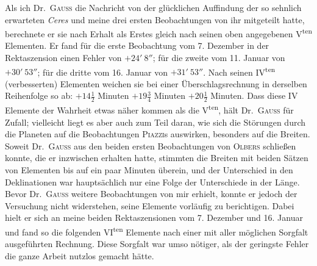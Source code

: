 Als ich Dr.\ \textsc{Gauss} die Nachricht von der glücklichen Auffindung der so sehnlich erwarteten \textit{Ceres} und meine drei ersten Beobachtungen von ihr mitgeteilt hatte, berechnete er sie nach Erhalt als Erstes gleich nach seinen oben angegebenen V\textsuperscript{ten} Elementen. Er fand für die erste Beobachtung vom 7. Dezember in der Rektaszension einen Fehler von $+24'\ 8''$; für die zweite vom 11. Januar von $+30'\ 53''$; für die dritte vom 16. Januar von $+31'\ 53''$. Nach seinen IV\textsuperscript{ten} (verbesserten) Elementen weichen sie bei einer Überschlagsrechnung in derselben Reihenfolge so ab: $+14\frac12$ Minuten $+19\frac34$ Minuten $+20\frac12$ Minuten. Dass diese IV Elemente der Wahrheit etwas näher kommen als die V\textsuperscript{ten}, hält Dr.\ \textsc{Gauss} für Zufall; vielleicht liegt es aber auch zum Teil daran, wie sich die Störungen durch die Planeten auf die Beobachtungen \textsc{Piazzi}s auswirken, besonders auf die Breiten. Soweit Dr.\ \textsc{Gauss} aus den beiden ersten Beobachtungen von \textsc{Olbers} schließen konnte, die er inzwischen erhalten hatte, stimmten die Breiten mit beiden Sätzen von Elementen bis auf ein paar Minuten überein, und der Unterschied in den Deklinationen war hauptsächlich nur eine Folge der Unterschiede in der Länge. Bevor Dr.\ \textsc{Gauss} weitere Beobachtungen von mir erhielt, konnte er jedoch der Versuchung nicht widerstehen, seine Elemente vorläufig zu berichtigen. Dabei hielt er sich an meine beiden Rektaszensionen vom 7. Dezember und 16. Januar und fand so die folgenden VI\textsuperscript{ten} Elemente nach einer mit aller möglichen Sorgfalt ausgeführten Rechnung. Diese Sorgfalt war umso nötiger, als der geringste Fehler die ganze Arbeit nutzlos gemacht hätte.
